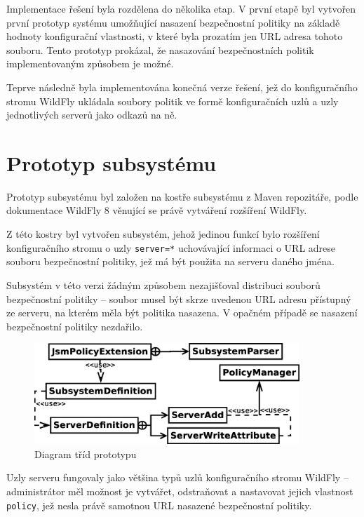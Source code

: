 Implementace řešení byla rozdělena do několika etap. V první etapě byl vytvořen první prototyp systému umožňující nasazení bezpečnostní politiky na základě hodnoty konfigurační vlastnosti, v které byla prozatím jen URL adresa tohoto souboru. Tento prototyp prokázal, že nasazování bezpečnostních politik implementovaným způsobem je možné.

Teprve následně byla implementována konečná verze řešení, jež do konfiguračního stromu WildFly ukládala soubory politik ve formě konfiguračních uzlů a uzly jednotlivých serverů jako odkazů na ně.

\section{Prototyp subsystému}

Prototyp subsystému byl založen na kostře subsystému z Maven repozitáře, podle dokumentace WildFly 8 věnující se právě vytváření rozšíření WildFly. \cite{WildFlyExtending}

Z této kostry byl vytvořen subsystém, jehož jedinou funkcí bylo rozšíření konfiguračního stromu o uzly {\tt server=*} uchovávající informaci o URL adrese souboru bezpečnostní politiky, jež má být použita na serveru daného jména.

Subsystém v této verzi žádným způsobem nezajišťoval distribuci souborů bezpečnostní politiky -- soubor musel být skrze uvedenou URL adresu přístupný ze serveru, na kterém měla být politika nasazena. V opačném případě se nasazení bezpečnostní politiky nezdařilo.

\begin{figure}[ht]
  \centering
  \includegraphics[width=10cm]{fig/tridy1}
  \caption{Diagram tříd prototypu}
  \label{tridy1}
\end{figure}

Uzly serveru fungovaly jako většina typů uzlů konfiguračního stromu WildFly -- administrátor měl možnost je vytvářet, odstraňovat a nastavovat jejich vlastnost {\tt policy}, jež nesla právě samotnou URL nasazené bezpečnostní politiky.

